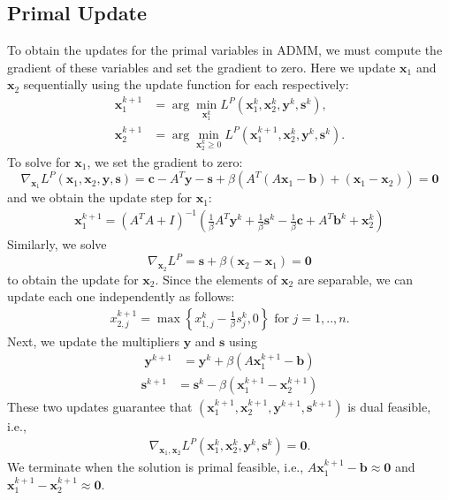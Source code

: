 \documentclass{article}
\begin{document}
\subsection*{Primal Update}
To obtain the updates for the primal variables in ADMM, we must compute the gradient of these variables and set the gradient to zero. Here we update $\mathbf{x}_{1}$ and $\mathbf{x}_{2}$ sequentially using the update function for each respectively:
\begin{align}
\mathbf{x}_{1}^{k+1} & = \arg \min_{\mathbf{x}_{1}^{k}} L^{P}(\mathbf{x}_{1}^{k},\mathbf{x}_{2}^{k},\mathbf{y}^{k},\mathbf{s}^k),\\
\mathbf{x}_{2}^{k+1} & = \arg \min_{\mathbf{x}_{2}^{k} \geq 0} L^{P}(\mathbf{x}_{1}^{k+1},\mathbf{x}_{2}^{k},\mathbf{y}^{k},\mathbf{s}^k).
\end{align}
To solve for $\mathbf{x}_{1}$, we set the gradient to zero:
\[
\nabla_{\mathbf{x}_{1}}L^{P}(\mathbf{x}_{1},\mathbf{x}_{2},\mathbf{y}, \mathbf{s})=\mathbf{c}-A^{T}\mathbf{y}-\mathbf{s}+\beta\left(A^{T}\left(A\mathbf{x}_{1}-\mathbf{b}\right)+\left(\mathbf{x}_{1}-\mathbf{x}_{2}\right)\right) = \mathbf{0}
\]
and we obtain the update step for $\mathbf{x}_{1}$:
\begin{align}\label{eq:x1_primal_update}
\mathbf{x}_{1}^{k+1} = \left(A^{T}A+I\right)^{-1}\left(\frac{1}{\beta}A^{T}\mathbf{y}^k+\frac{1}{\beta}\mathbf{s}^k-\frac{1}{\beta}\mathbf{c}+A^{T}\mathbf{b}^k+\mathbf{x}_{2}^k\right)
\end{align}
Similarly, we solve
\[
\nabla_{\mathbf{x}_{2}}L^{P}=\mathbf{s}+\beta\left(\mathbf{x}_{2}-\mathbf{x}_{1}\right) = \mathbf{0}
\]
to obtain the update for $\mathbf{x}_{2}$. Since the elements of $\mathbf{x}_{2}$ are separable, we can update each one independently as follows:
\begin{align}
{x}_{2,j}^{k+1} = \max\left\{ {x}_{1,j}^k-\frac{1}{\beta}{s}_j^k,0\right\} \text{ for $j = 1,..,n$}.
\end{align}
Next, we update the multipliers $\mathbf{y}$ and $\mathbf{s}$ using
\begin{align}\label{eq:y_primal_update}
\mathbf{y}^{k+1} &= \mathbf{y}^{k} + \beta (A \mathbf{x}_1^{k+1}  - \mathbf{b}) 
\end{align}
\begin{align}\label{eq:s_primal_update}
\mathbf{s}^{k+1} &= \mathbf{s}^{k}  - \beta  (\mathbf{x}_1^{k+1}  -\mathbf{x}_2^{k+1} )
\end{align}
These two updates guarantee that $\left(\mathbf{x}_1^{k+1}, \mathbf{x}_2^{k+1}, \mathbf{y}^{k+1}, \mathbf{s}^{k+1}\right)$ is dual feasible, i.e.,
\begin{align*}
\nabla_{\mathbf{x}_{1}, \mathbf{x}_{2}}L^{P}(\mathbf{x}_{1}^k,\mathbf{x}_{2}^k,\mathbf{y}^k ,\mathbf{s}^k)=\mathbf{0}.
\end{align*}
We terminate when the solution is primal feasible, i.e., $A \mathbf{x}_1^{k+1}  - \mathbf{b} \approx \mathbf{0}$ and $\mathbf{x}_1^{k+1}  -\mathbf{x}_2^{k+1} \approx \mathbf{0}$.
\end{document}
